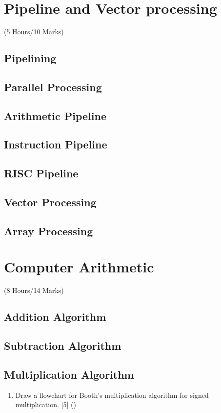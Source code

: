 \documentclass[12pt]{article}
\begin{document}
\pagebreak
\section{Pipeline and Vector processing}
\begin{center}(5 Hours/10 Marks)\end{center}
\subsection{Pipelining}
\subsection{Parallel Processing}
\subsection{Arithmetic Pipeline}
\subsection{Instruction Pipeline}
\subsection{RISC Pipeline}
\subsection{Vector Processing}
\subsection{Array Processing}

\pagebreak
\section{Computer Arithmetic}
\begin{center}(8 Hours/14 Marks)\end{center}
\subsection{Addition Algorithm}
\subsection{Subtraction Algorithm}
\subsection{Multiplication Algorithm}
\begin{enumerate}[noitemsep, topsep=0pt]
	\item Draw a flowchart for Booth's multiplication algorithm for signed multiplication. \hfill [5] ()
\end{enumerate}
\end{document}
